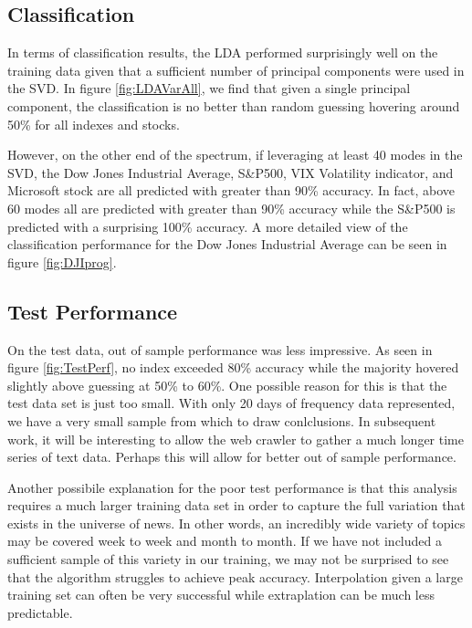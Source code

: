 \documentclass{article}
\begin{document}
\subsection{Classification}
In terms of classification results, the LDA performed surprisingly well on the training data given that a sufficient number of principal components were used in the SVD.  In figure \ref{fig:LDAVarAll}, we find that given a single principal component, the classification is no better than random guessing hovering around 50\% for all indexes and stocks.  

However, on the other end of the spectrum, if leveraging at least 40 modes in the SVD, the Dow Jones Industrial Average, S\&P500, VIX Volatility indicator, and Microsoft stock are all predicted with greater than 90\% accuracy.  In fact, above 60 modes all are predicted with greater than 90\% accuracy while the S\&P500 is predicted with a surprising 100\% accuracy.  A more detailed view of the classification performance for the Dow Jones Industrial Average can be seen in figure \ref{fig:DJIprog}.

\subsection{Test Performance}
On the test data, out of sample performance was less impressive.  As seen in figure \ref{fig:TestPerf}, no index exceeded 80\% accuracy while the majority hovered slightly above guessing at 50\% to 60\%.  One possible reason for this is that the test data set is just too small.  With only 20 days of frequency data represented, we have a very small sample from which to draw conlclusions.  In subsequent work, it will be interesting to allow the web crawler to gather a much longer time series of text data.  Perhaps this will allow for better out of sample performance.

Another possibile explanation for the poor test performance is that this analysis requires a much larger training data set in order to capture the full variation that exists in the universe of news.  In other words, an incredibly wide variety of topics may be covered week to week and month to month.  If we have not included a sufficient sample of this variety in our training, we may not be surprised to see that the algorithm struggles to achieve peak accuracy.  Interpolation given a large training set can often be very successful while extraplation can be much less predictable. 
\end{document}
